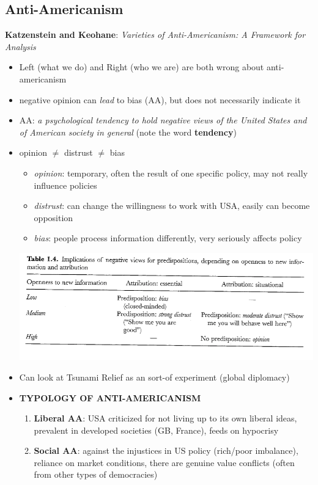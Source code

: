 \documentclass{article}
\begin{document}
\subsection*{Anti-Americanism}
\textbf{Katzenstein and Keohane}: \textit{Varieties of Anti-Americanism: A Framework for Analysis}
\begin{itemize}
    \item Left (what we do) and Right (who we are) are both wrong about anti-americanism
    \item negative opinion can \textit{lead} to bias (AA), but does not necessarily indicate it
    \item AA: \textit{a psychological tendency to hold negative views of the United States and of American society in general} (note the word \textbf{tendency})
    \item opinion $\neq$ distrust $\neq$ bias
    \begin{itemize}
        \item \textit{opinion}: temporary, often the result of one specific policy, may not really influence policies
        \item \textit{distrust}: can change the willingness to work with USA, easily can become opposition
        \item \textit{bias}: people process information differently, very seriously affects policy
    \end{itemize}
    \includegraphics[width=\textwidth]{opdistbias.png}
    \item Can look at Tsunami Relief as an sort-of experiment (global diplomacy)
    \item \textbf{TYPOLOGY OF ANTI-AMERICANISM}
    \begin{enumerate}
        \item \textbf{Liberal AA}: USA criticized for not living up to its own liberal ideas, prevalent in developed societies (GB, France), feeds on hypocrisy
        \item \textbf{Social AA}: against the injustices in US policy (rich/poor imbalance), reliance on market conditions, there are genuine value conflicts (often from other types of democracies)

\end{enumerate}
\end{itemize}
\end{document}
